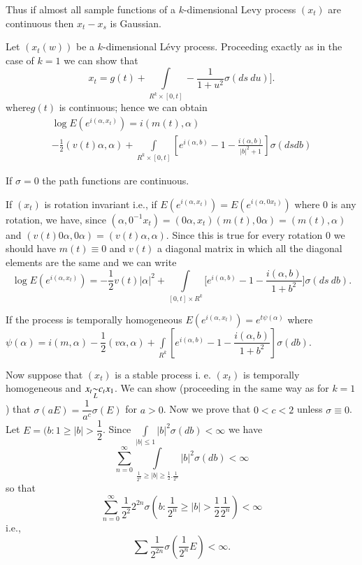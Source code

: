Thus if almost all sample functions of a $k$-dimensional Levy process
$(x_t)$ are continuous then $x_{t}-x_{s}$ is Gaussian. 

Let $(x_t(w))$ be a $k$-dimensional L\'evy process. Proceeding exactly as
in the case of $k=1$ we can show that  
$$
x_t = g(t) + \int\limits_{R^k \times [0, t]}- \frac{1}{1+
    u^2} \sigma (ds\ du)]. 
$$
where\pageoriginale $g(t)$ is continuous; hence we can obtain
\begin{multline*}
  \log E(e^{i (\alpha, x_t)}) = i(m(t), \alpha)\\
  -\frac{1}{2}(v(t)\alpha, \alpha) + \int \limits_{R^k \times [0,
      t]} \left[e^{i(\alpha, b) }-1- \frac{i(\alpha, b)}{|b|^2+1}\right]
  \sigma(ds db) 
\end{multline*}

If $\sigma = 0$ the path functions are continuous.

If $(x_t)$ is rotation invariant i.e., if $ E(e^{i (\alpha, x_t)})=
E(e^{i (\alpha, 0x_t)})$ where $0$ is any rotation, we have, since
$(\alpha, 0^{-1} x_t)=(0 \alpha, x_t) (m(t), 0 \alpha) = (m(t),
\alpha)$ and $(v(t) 0 \alpha, 0 \alpha) = (v(t) \alpha,
\alpha)$. Since this is true for every rotation $0$ we should have
$m(t) \equiv 0$ and $v(t)$ a diagonal matrix in which all the diagonal
elements are the same and we can write 
$$
\log  E(e^{i (\alpha, x_t)}) = -\frac{1}{2} v (t) |\alpha|^2 + \int
\limits_{[0, t] \times R^k} [e^{i(\alpha, b)}-1- \frac{i(\alpha,
    b)}{1+ b^2} \bigg] \sigma (ds\ db). 
$$

If the process is temporally homogeneous $ E(e^{i (\alpha, x_t)})=
e^{t \psi (\alpha)}$ where $\psi (\alpha) = i(m, \alpha) -
\dfrac{1}{2}(v \alpha, \alpha) + \int\limits_{ R^k} \left[e^{i(\alpha, b)}
  - 1 - \dfrac{i(\alpha, b)}{1+ b^2} \right] \sigma (db)$. 

Now suppose that $(x_t)$ is a stable process i. e. $(x_t)$ is
temporally homogeneous and $x_t {\displaystyle{\mathop{\sim}_{L}}} c_t x_1$. We can show
(proceeding in the same way as for $k=1$) that $\sigma(a E)=
\dfrac{1}{a^c}\sigma(E)$ for $a > 0$. Now we prove that $0 < c < 2$ unless
$\sigma \equiv 0$. Let $E= (b: 1 \geq |b| > \dfrac{1}{2}$. Since
$\int\limits_{|b| \leq 1} |b|^2 \sigma (db) < \infty$ we have  
$$
\sum^{\infty}_{n=0} \int \limits_{\frac{1}{2^1} \geq |b| \geq
  \frac{1}{2}. \frac{1}{2^n}} |b|^2 \sigma (db) < \infty
$$
so that
$$
\sum^{\infty}_{n=0} \frac{1}{2^2} 2^{2n} \sigma\left(b: \frac{1}{2^n} \geq
  |b| >\frac{1}{2} \frac{1}{2^n}\right) < \infty 
$$
i.e.,
$$
\sum \frac{1}{2^{2n}}
  \sigma \left(\frac{1}{2^n} E\right) < \infty.
$$

